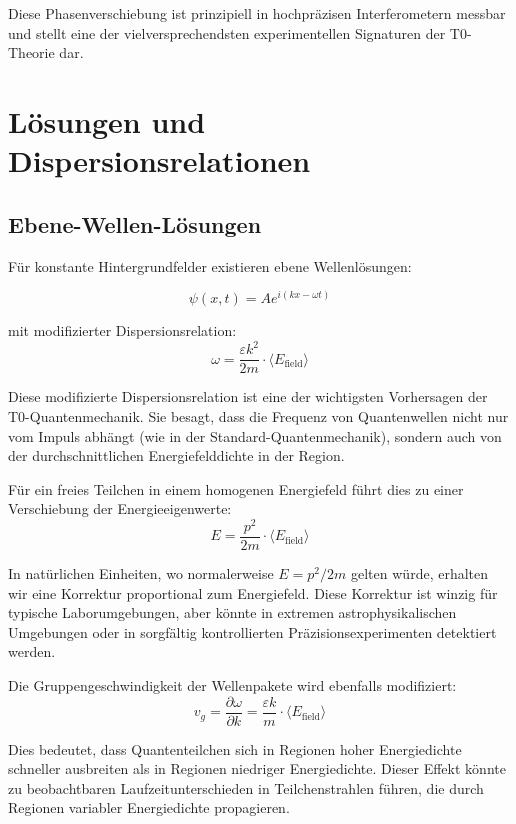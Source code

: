 \documentclass[12pt,a4paper]{article}
\theoremstyle{definition}
\theoremstyle{remark}
\begin{document}
Diese Phasenverschiebung ist prinzipiell in hochpr{\"a}zisen Interferometern messbar und stellt eine der vielversprechendsten experimentellen Signaturen der T0-Theorie dar.

\section{L{\"o}sungen und Dispersionsrelationen}

\subsection{Ebene-Wellen-L{\"o}sungen}

F{\"u}r konstante Hintergrundfelder existieren ebene Wellenl{\"o}sungen:

\begin{equation}
	\psi(x,t) = A e^{i(kx - \omega t)}
	\label{eq:plane_wave}
\end{equation}

mit modifizierter Dispersionsrelation:
\begin{equation}
	\boxed{\omega = \frac{\varepsilon k^2}{2m} \cdot \langle E_{\text{field}} \rangle}
	\label{eq:modified_dispersion}
\end{equation}

Diese modifizierte Dispersionsrelation ist eine der wichtigsten Vorhersagen der T0-Quantenmechanik. Sie besagt, dass die Frequenz von Quantenwellen nicht nur vom Impuls abh{\"a}ngt (wie in der Standard-Quantenmechanik), sondern auch von der durchschnittlichen Energiefelddichte in der Region.

F{\"u}r ein freies Teilchen in einem homogenen Energiefeld f{\"u}hrt dies zu einer Verschiebung der Energieeigenwerte:
$$E = \frac{p^2}{2m} \cdot \langle E_{\text{field}} \rangle$$

In nat{\"u}rlichen Einheiten, wo normalerweise $E = p^2/2m$ gelten w{\"u}rde, erhalten wir eine Korrektur proportional zum Energiefeld. Diese Korrektur ist winzig f{\"u}r typische Laborumgebungen, aber k{\"o}nnte in extremen astrophysikalischen Umgebungen oder in sorgf{\"a}ltig kontrollierten Pr{\"a}zisionsexperimenten detektiert werden.

Die Gruppengeschwindigkeit der Wellenpakete wird ebenfalls modifiziert:
$$v_g = \frac{\partial \omega}{\partial k} = \frac{\varepsilon k}{m} \cdot \langle E_{\text{field}} \rangle$$

Dies bedeutet, dass Quantenteilchen sich in Regionen hoher Energiedichte schneller ausbreiten als in Regionen niedriger Energiedichte. Dieser Effekt k{\"o}nnte zu beobachtbaren Laufzeitunterschieden in Teilchenstrahlen f{\"u}hren, die durch Regionen variabler Energiedichte propagieren.
\end{document}
